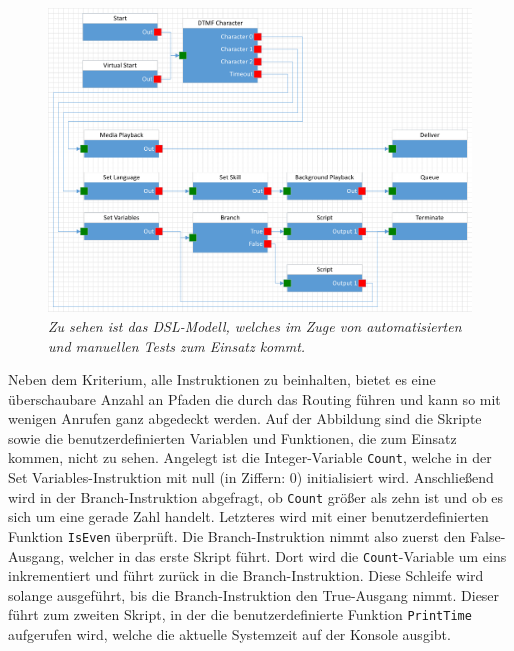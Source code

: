 \begin{figure} %
	\centering
		\includegraphics[width=\textwidth]{img/TestRouting.png}
	\caption[DSL-Modell für manuelle Tests]{\textit{Zu sehen ist das DSL-Modell, welches im Zuge von automatisierten und manuellen  Tests zum Einsatz kommt.}}
	\label{fig:TestRouting}
\end{figure}
 Neben dem Kriterium, alle Instruktionen zu beinhalten, bietet es eine überschaubare Anzahl an Pfaden die durch das Routing  führen und kann so mit wenigen Anrufen ganz abgedeckt werden. Auf der Abbildung sind die Skripte sowie die benutzerdefinierten Variablen und Funktionen, die zum Einsatz kommen, nicht zu sehen. Angelegt ist die Integer-Variable \texttt{Count}, welche in der Set Variables-Instruktion mit null (in Ziffern: 0) initialisiert wird. Anschließend wird in der Branch-Instruktion abgefragt, ob \texttt{Count} größer als zehn ist und ob es sich um eine gerade Zahl handelt. Letzteres wird mit einer benutzerdefinierten Funktion \texttt{IsEven} überprüft. Die Branch-Instruktion nimmt also zuerst den False-Ausgang, welcher in das erste Skript führt. Dort wird die \texttt{Count}-Variable um eins inkrementiert und führt zurück in die Branch-Instruktion. Diese Schleife wird solange ausgeführt, bis die Branch-Instruktion den True-Ausgang nimmt. Dieser führt zum zweiten Skript, in der die benutzerdefinierte Funktion \texttt{PrintTime} aufgerufen wird, welche die aktuelle Systemzeit auf der Konsole ausgibt.




